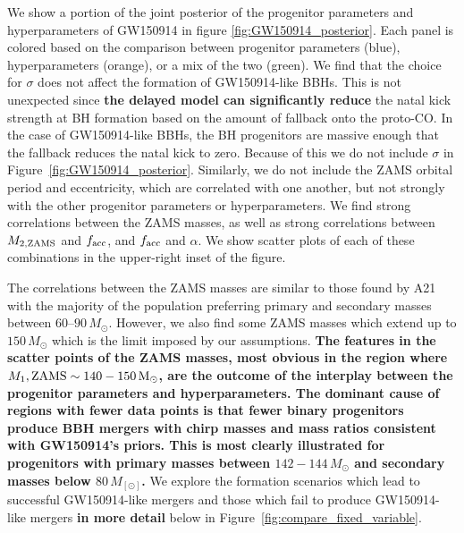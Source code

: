 \documentclass[linenumbers,twocolumn]{aastex631}
\begin{document}
We show a portion of the joint posterior of the progenitor parameters and
hyperparameters of GW150914 in figure \ref{fig:GW150914_posterior}. Each panel
is colored based on the comparison between progenitor parameters (blue),
hyperparameters (orange), or a mix of the two (green). We find that the choice
for $\sigma$ does not affect the formation of GW150914-like BBHs. This is not
unexpected since \textbf{the \citet{Fryer2012} delayed model can significantly reduce} the
natal kick strength at BH formation based on the amount of fallback onto the
proto-CO. In the case of GW150914-like BBHs, the BH progenitors are massive
enough that the fallback reduces the natal kick to zero. Because of this we do
not include $\sigma$ in Figure~\ref{fig:GW150914_posterior}. Similarly, we do
not include the ZAMS orbital period and eccentricity, which are correlated with
one another, but not strongly with the other progenitor parameters or
hyperparameters. We find strong correlations between the ZAMS masses, as well as
strong correlations between $M_{2,\rm{ZAMS}}$ and $f_{\rm{acc}}$, and
$f_{\rm{acc}}$ and $\alpha$. We show scatter plots of each of these combinations
in the upper-right inset of the figure.

The correlations between the ZAMS masses are similar to those found by A21 with
the majority of the population preferring primary and secondary masses between
$60$--$90\,M_{\odot}$. However, we also find some ZAMS masses which extend up to
$150\,M_{\odot}$ which is the limit imposed by our assumptions. \textbf{The features in the scatter points of the ZAMS masses, most obvious in the region where $M_1,\rm{ZAMS}\sim 140-150\,M_\odot$, are the outcome of the interplay between the progenitor parameters and hyperparameters. The dominant cause of regions with fewer data points is that fewer binary progenitors produce BBH mergers with chirp masses and mass ratios consistent with GW150914's priors. This is most clearly illustrated for progenitors with primary masses between $142-144\,M_\odot$ and secondary masses below $80\,M_[\odot]$.} We explore the
formation scenarios which lead to successful GW150914-like mergers and those
which fail to produce GW150914-like mergers \textbf{in more detail} below in
Figure~\ref{fig:compare_fixed_variable}.
\end{document}
